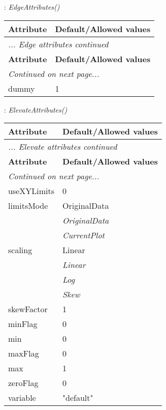 \documentclass[10pt,a4paper]{report}
\begin{document}
\newpage

{}
: {\it EdgeAttributes() }\\[-3mm]

\begin{longtable}{ll}
{\bf Attribute} & {\bf Default/Allowed values} \\
\hline \hline
\endfirsthead
\multicolumn{2}{l}{{\it ... Edge attributes continued}} \\
{\bf Attribute} & {\bf Default/Allowed values} \\
\hline \hline
\endhead
\hline
\multicolumn{2}{l}{{\it Continued on next page...}} \\
\endfoot
\hline
\endlastfoot

dummy  &  1 \\
\end{longtable}

\newpage

{}
: {\it ElevateAttributes() }\\[-3mm]

\begin{longtable}{ll}
{\bf Attribute} & {\bf Default/Allowed values} \\
\hline \hline
\endfirsthead
\multicolumn{2}{l}{{\it ... Elevate attributes continued}} \\
{\bf Attribute} & {\bf Default/Allowed values} \\
\hline \hline
\endhead
\hline
\multicolumn{2}{l}{{\it Continued on next page...}} \\
\endfoot
\hline
\endlastfoot

useXYLimits  &  0 \\
limitsMode  &  OriginalData   \\
 & {\it  OriginalData} \\
 & {\it  CurrentPlot} \\
scaling  &  Linear   \\
 & {\it  Linear} \\
 & {\it  Log} \\
 & {\it  Skew} \\
skewFactor  &  1 \\
minFlag  &  0 \\
min  &  0 \\
maxFlag  &  0 \\
max  &  1 \\
zeroFlag  &  0 \\
variable  &  "default" \\
\end{longtable}
\end{document}
